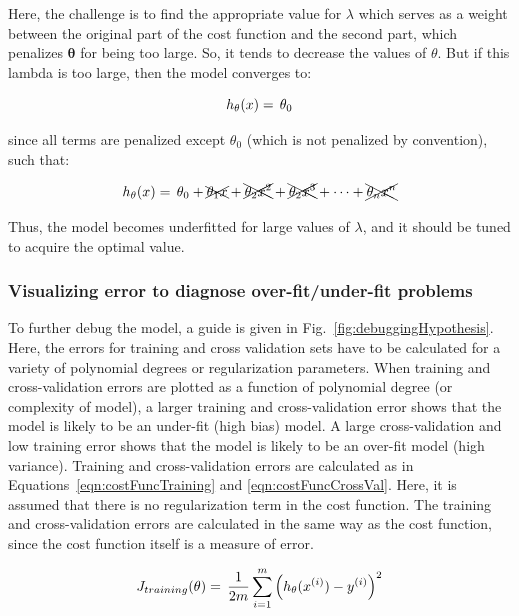 Here, the challenge is to find the appropriate value for $\lambda$ which serves as a weight between the original part of the cost function and the second part, which penalizes $\bm{\theta}$ for being too large. 
So, it tends to decrease the values of $\theta$. But if this lambda is too large, then the model converges to:

\begin{equation}{\label{eqn:costFuncRegularizedTooMuch}}
h_\theta(x)
=\,
\theta_0 
\end{equation} 

since all terms are penalized except $\theta_0$ (which is not penalized by convention), such that:

\begin{equation}{\label{eqn:costFuncRegularizedTooMuchHow}}
h_\theta(x)
=\,
\theta_0 + \xcancel{\theta_1 x}  + \xcancel{\theta_2 x^2}  + \xcancel{\theta_2 x^3}  + \cdots + \xcancel{\theta_n x^n}
\end{equation} 

Thus, the model becomes underfitted for large values of $\lambda$, and it should be tuned to acquire the optimal value.


\subsubsection{Visualizing error to diagnose over-fit/under-fit problems}

To further debug the model, a guide is given in Fig.~\ref{fig:debuggingHypothesis}. 
Here, the errors for training and cross validation sets have to be calculated for a variety of polynomial degrees or regularization parameters. 
When training and cross-validation errors are plotted as a function of polynomial degree (or complexity of model), a larger training and cross-validation error shows that the model is likely to be an under-fit (high bias) model.  %
A large cross-validation and low training error shows that the model is likely to be an over-fit model (high variance). 
Training and cross-validation errors are calculated as in Equations~\ref{eqn:costFuncTraining} and \ref{eqn:costFuncCrossVal}. 
Here, it is assumed that there is no regularization term in the cost function. 
The training and cross-validation errors are calculated in the same way as the cost function, since the cost function itself is a measure of error.


\iffalse
\begin{equation}{\label{eqn:trainingError}}
J_{training}(\theta)
=\,
\frac{1}{2m} \sum\limits_{i=1}^{m} \Big(h_\theta(x^{(i)}) - y^{(i)}\Big)^2  
\end{equation} 

